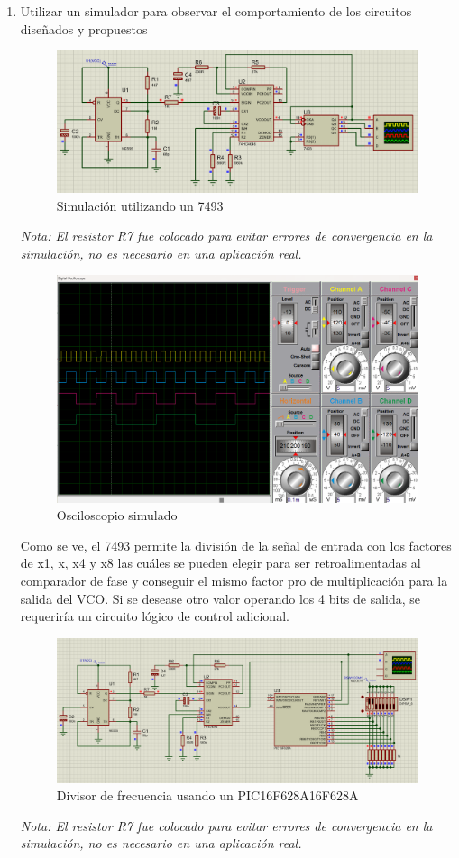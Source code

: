 \begin{enumerate}[label=\alph*)]
    \item Utilizar un simulador para observar el comportamiento de los circuitos diseñados y propuestos
    \begin{figure}[H]
        \centering
        \includegraphics[width=.9\textwidth]{imgs/3.5. Esquemático.png}
        \caption{Simulación utilizando un 7493}
    \end{figure}
    {\it Nota: El resistor R7 fue colocado para evitar errores de convergencia en la simulación, no es necesario en una aplicación real.}
    \begin{figure}[H]
        \centering
        \includegraphics[width=.9\textwidth]{imgs/3.5. Osciloscopio.png}
        \caption{Osciloscopio simulado}
    \end{figure}
    Como se ve, el 7493 permite la división de la señal de entrada con los factores de x1, x, x4 y x8 las cuáles se pueden elegir para ser retroalimentadas al comparador de fase y conseguir el mismo factor pro de multiplicación para la salida del VCO. Si se desease otro valor operando los 4 bits de salida, se requeriría un circuito lógico de control adicional.
    \begin{figure}[H]
        \centering
        \includegraphics[width=.9\textwidth]{imgs/3.5. Simulación con PIC.png}
        \caption{Divisor de frecuencia usando un PIC16F628A16F628A}
    \end{figure}
    {\it Nota: El resistor R7 fue colocado para evitar errores de convergencia en la simulación, no es necesario en una aplicación real.}
\end{enumerate}